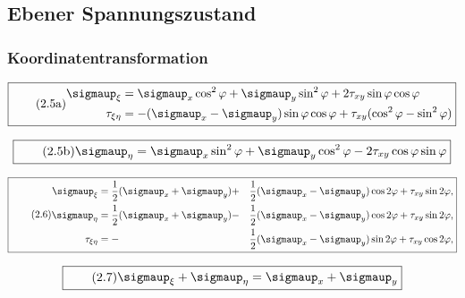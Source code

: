 \documentclass[11pt]{article}
\newcommand{\1}{ {\mathds{1}} }
\renewcommand{\sigma  }{\sigmaup   }
\begin{document}
		\subsection{Ebener Spannungszustand}
		
		\subsubsection{Koordinatentransformation}

		\begin{equation}
			\boxed{
				\tag{2.5a}
				\begin{split}
					\sigma_{\xi} &= \sigma_x \cos^2 \varphi + \sigma_y \sin^2\varphi + 2 \tau_{xy} \sin\varphi \cos\varphi\\
					\tau_{\xi \eta} &= -(\sigma_x - \sigma_y) \sin \varphi \cos \varphi + \tau_{xy} (\cos^2\varphi - \sin^2\varphi)
				\end{split}
			}
		\end{equation}
	 
		\begin{equation}
			\boxed{
				\tag{2.5b}
				\begin{split}
					\sigma_{\eta}
					=
					\sigma_{x} \sin^2 \varphi + \sigma_y \cos^2 \varphi - 2 \tau_{xy} \cos\varphi\sin\varphi
				\end{split}
			}
		\end{equation}

		\begin{equation}
			\boxed{
				\tag{2.6}
				\begin{split}
					\sigma_{\xi} &= \frac{1}{2} (\sigma_x + \sigma_y) +&\frac{1}{2}(\sigma_x - \sigma_y) \cos 2 \varphi + \tau_{xy} \sin 2 \varphi, \\
					\sigma_{\eta} &= \frac{1}{2} (\sigma_x + \sigma_y) -&\frac{1}{2}(\sigma_x - \sigma_y) \cos 2 \varphi + \tau_{xy} \sin 2 \varphi,\\
					\tau_{\xi \eta} &= -&\frac{1}{2}(\sigma_x - \sigma_y) \sin 2 \varphi + \tau_{xy} \cos 2 \varphi,
				\end{split}
			}
		\end{equation}
		
		\begin{equation}
			\boxed{
				\tag{2.7}
				\begin{split}
					\sigma_\xi + \sigma_\eta
					=
					\sigma_x + \sigma_y
				\end{split}
			}
		\end{equation}
\end{document}

